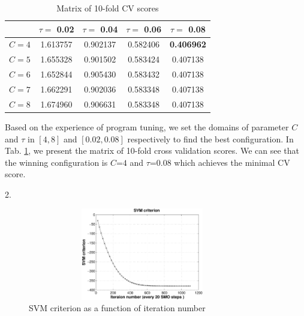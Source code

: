 \begin{table}[!h] 
	
 \centering\small
 \begin{threeparttable}
 \caption{\label{task1} \small Matrix of 10-fold CV scores\vspace{-5mm}
}
\vspace{-5mm}
  \begin{tabular}{lcccc}
  \toprule
           &$\tau=$ 0.02 & $\tau=$ 0.04 & $\tau=$ 0.06  & $\tau=$ 0.08 \\
  \midrule
   $C=4$ &1.613757  &0.902137  & 0.582406 & \textbf{0.406962} \\
$C=5$ & 1.655328 &0.901502 & 0.583424 & 0.407138\\
   $C=6$ &1.652844  &0.905430  & 0.583432 &0.407138\\
  $C=7$ &1.662291 &0.902036 & 0.583348 & 0.407138\\
  $C=8$ &1.674960 &0.906631 & 0.583348 & 0.407138\\
  \bottomrule
  \end{tabular}
 \end{threeparttable}
\end{table}

Based on the experience of program tuning, we set the domains of parameter $C$ and $\tau$ in $[4,8]$ and $[0.02,0.08]$ respectively to find the best configuration. In Tab. \ref{task1}, we present the matrix of 10-fold cross validation scores. We can see that the winning configuration is $C$=$4$ and $\tau$=$0.08$ which achieves the minimal CV score.


2.

\begin{figure}[htbp]
   \centering	
      \includegraphics[width=10cm, height=4cm]{figs/task2-1.pdf} 	
   \vspace{-0.3cm}
   \caption{SVM criterion as a function of iteration number}\label{fig:task2-1}
\end{figure}

